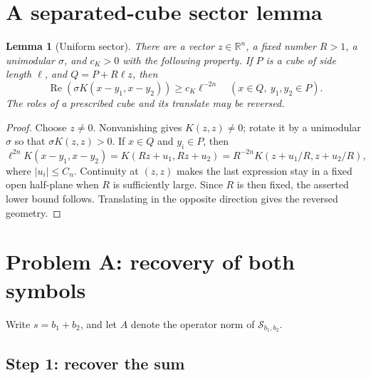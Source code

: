\documentclass[11pt]{article}
\newtheorem{lemma}{Lemma}
\newcommand{\R}{\mathbb R}
\newcommand{\1}{\mathbf 1}
\begin{document}
\section{A separated-cube sector lemma}

\begin{lemma}[Uniform sector]
\label{lem:sector}
There are a vector \(z\in\R^n\), a fixed number \(R>1\), a unimodular
\(\sigma\), and \(c_K>0\) with the following property.  If \(P\) is a cube
of side length \(\ell\), and \(Q=P+R\ell z\), then
\[
 \operatorname{Re}\!\left(\sigma K(x-y_1,x-y_2)\right)
       \ge c_K\ell^{-2n}
 \quad(x\in Q,\ y_1,y_2\in P).
\]
The roles of a prescribed cube and its translate may be reversed.
\end{lemma}

\begin{proof}
Choose \(z\ne0\).  Nonvanishing gives \(K(z,z)\ne0\); rotate it by a
unimodular \(\sigma\) so that \(\sigma K(z,z)>0\).  If \(x\in Q\) and
\(y_i\in P\), then
\[
 \ell^{2n}K(x-y_1,x-y_2)
 =K(Rz+u_1,Rz+u_2)
 =R^{-2n}K(z+u_1/R,z+u_2/R),
\]
where \(|u_i|\le C_n\).  Continuity at \((z,z)\) makes the last expression
stay in a fixed open half-plane when \(R\) is sufficiently large.  Since
\(R\) is then fixed, the asserted lower bound follows.  Translating in the
opposite direction gives the reversed geometry.
\end{proof}

\section{Problem A: recovery of both symbols}

Write \(s=b_1+b_2\), and let \(A\) denote the operator norm of
\(\mathcal S_{b_1,b_2}\).

\subsection*{Step 1: recover the sum}
\end{document}
